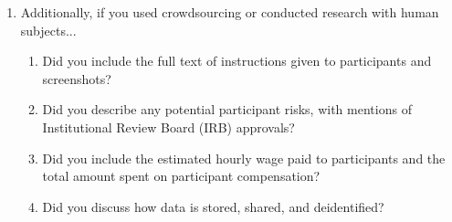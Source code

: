 \begin{enumerate}
\item Additionally, if you used crowdsourcing or conducted research with human subjects...
\begin{enumerate}
  \item Did you include the full text of instructions given to participants and screenshots?
  \item Did you describe any potential participant risks, with mentions of Institutional Review Board (IRB) approvals?
  \item Did you include the estimated hourly wage paid to participants and the total amount spent on participant compensation?
  \item Did you discuss how data is stored, shared, and deidentified?
\end{enumerate}

\end{enumerate}
